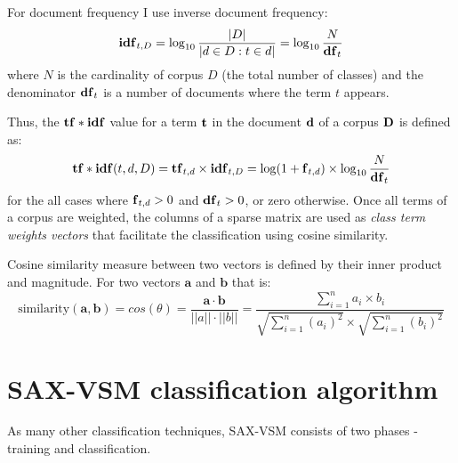 For document frequency I use inverse document frequency:
\begin{equation}
 \mbox{\textbf{idf}}_{t, D} =  \log_{10}\frac{|D|}{|d \in D : t \in d|} = \log_{10}\frac{N}{\mbox{\textbf{df}}_{t}}
 \label{formula:idf}
\end{equation} 
where $N$ is the cardinality of corpus $D$ (the total number of classes) and the 
denominator $\mbox{\textbf{df}}_{t}$ is a number of documents where the term $t$ appears.

Thus, the $\text{\textbf{tf}} \ast \text{\textbf{idf}}$ value for a term $\text{\textbf{t}}$ in the document 
$\text{\textbf{d}}$ of a corpus $\text{\textbf{D}}$ is defined as:
\begin{equation}
 \text{\textbf{tf}} \ast \text{\textbf{idf}}(t, d, D) =  \text{\textbf{tf}}_{t, d} \times \text{\textbf{idf}}_{t, D} = \log(1 + \text{\textbf{f}}_{t,d})
\times \log_{10}\frac{N}{\mbox{\textbf{df}}_{t}}
 \label{formula:tfidf}
\end{equation} 
for the all cases where $\mbox{\textbf{f}}_{t,d}>0$ and $\mbox{\textbf{df}}_{t}>0$, or zero otherwise.
Once all terms of a corpus are weighted, the columns of a sparse matrix are used 
as \textit{class term weights vectors} that facilitate the classification using cosine similarity. 

Cosine similarity measure between two vectors is defined by their inner product and magnitude. 
For two vectors $\mathbf{a}$ and $\mathbf{b}$ that is:
\begin{equation}
\mbox{similarity}(\mathbf{a},\mathbf{b}) = cos(\theta) = 
\frac{ \mathbf{a} \cdot \mathbf{b} } {\left| \left| a \right| \right| \cdot \left| \left| b \right|\right|} =
\frac{ \sum\limits_{i=1}^{n}{a_{i} \times b_{i}} }{ \sqrt{\sum\limits_{i=1}^{n}{(a_{i})^2}} \times \sqrt{\sum\limits_{i=1}^{n}{(b_{i})^2}}}
\end{equation} 

\section{SAX-VSM classification algorithm} \label{sax-vsm}
As many other classification techniques, SAX-VSM consists of two phases - 
training and classification. 

